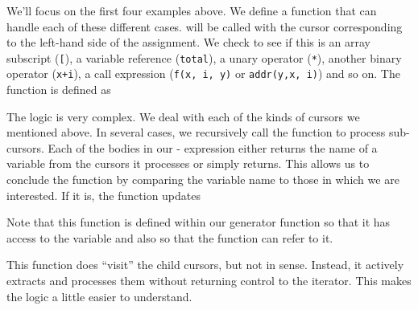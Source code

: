 We'll focus on the first four examples above.  We define a function
that can handle each of these different cases.  
will be called with the cursor corresponding to the left-hand side of
the assignment.  We check to see if this is an array subscript
(\verb+[+), a variable reference (\verb+total+), a unary operator
(\verb+*+), another binary operator (\verb|x+i|), a call expression
(\verb+f(x, i, y)+ or \verb+addr(y,x, i)+) and so on.
The function is defined as
The logic is very complex. We deal with each of the kinds of cursors
we mentioned above. In several cases, we recursively call the
 function to process sub-cursors.
Each of the bodies in our - expression
either returns the name of a variable from the cursors it processes
or simply returns. This allows us to conclude the function
by comparing the variable name to those in which we are interested.
If it is, the function updates 

Note that this function is defined within our generator function so
that it has access to the  variable and also so
that the  function can refer to it.

This function does ``visit'' the child cursors, but not in \libclang{}
sense. Instead, it actively extracts and processes them without
returning control to the \libclang{} iterator. This makes the logic a
little easier to understand.

